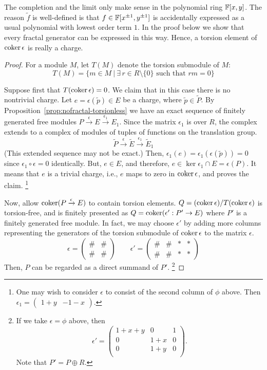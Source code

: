 The completion and the limit only make sense in the polynomial ring $\mathbb{F}[x,y]$.
The reason $\tilde f$ is well-defined is that $f \in \mathbb{F}[x^{\pm 1},y^{\pm 1}]$ is accidentally expressed
as a usual polynomial with lowest order term $1$.
In the proof below we show that every fractal generator can be expressed in this way.
Hence, a torsion element of $\mathop{\mathrm{coker}}\nolimits \epsilon$ is really a charge.

\begin{proof}
For a module $M$, let $T(M)$ denote the torsion submodule of $M$:
\[
 T(M) = \{ m \in M \ |\  \exists \, r \in R \setminus \{0\} \text{ such that } rm = 0 \}
\]

Suppose first that $T(\mathop{\mathrm{coker}}\nolimits \epsilon) = 0$.
We claim that in this case there is no nontrivial charge.
Let $e = \epsilon( \tilde p ) \in E$ be a charge, where $\tilde p \in \tilde P$.
By Proposition~\ref{prop:nofractal-torsionless}
we have an exact sequence of finitely generated free modules
$ P \xrightarrow{\epsilon} E \xrightarrow{\epsilon_1} E_1$.
Since the matrix $\epsilon_1$ is over $R$,
the complex extends to a complex of modules of tuples of functions on the translation group.
\[
 \tilde P \xrightarrow{\epsilon} \tilde E \xrightarrow{\epsilon_1} \tilde E_1
\]
(This extended sequence may not be exact.)
Then, $\epsilon_1(e) = \epsilon_1( \epsilon( \tilde p ) ) = 0$
since $\epsilon_1 \circ \epsilon = 0$ identically.
But, $e \in E$, and therefore, $e \in \ker \epsilon_1 \cap E = \epsilon(P)$.
It means that $e$ is a trivial charge, i.e., $e$ maps to zero in $\mathop{\mathrm{coker}}\nolimits \epsilon$,
and proves the claim.%
\footnote{
One may wish to consider $\epsilon$ to consist of the second column of $\phi$ above.
Then $\epsilon_1 = \begin{pmatrix} 1+y & -1-x \end{pmatrix}$.
}

Now, allow $\mathop{\mathrm{coker}}\nolimits (P \xrightarrow{\epsilon} E)$ to contain torsion elements.
$Q = (\mathop{\mathrm{coker}}\nolimits \epsilon) / T(\mathop{\mathrm{coker}}\nolimits \epsilon)$ is torsion-free,
and is finitely presented as $Q = \mathop{\mathrm{coker}}\nolimits( \epsilon' : P' \to E )$
where $P'$ is a finitely generated free module.
In fact, we may choose $\epsilon'$ by adding more columns representing the generators of
the torsion submodule of $\mathop{\mathrm{coker}}\nolimits \epsilon$ to the matrix $\epsilon$.
\[
 \epsilon = \begin{pmatrix} \# & \# \\ \# & \# \end{pmatrix} \quad \quad
 \epsilon'= \begin{pmatrix} \# & \# & * & * \\ \# & \# & * & * \end{pmatrix}
\]
Then, $P$ can be regarded as a direct summand of $P'$.%
\footnote{
If we take $\epsilon = \phi$ above,
then
\[
 \epsilon' =  \begin{pmatrix}
  1+x+y & 0   & 1 \\
     0  & 1+x & 0 \\
     0  & 1+y & 0 \\
 \end{pmatrix}.
\]
Note that $P' = P \oplus R$.
}


\end{proof}
